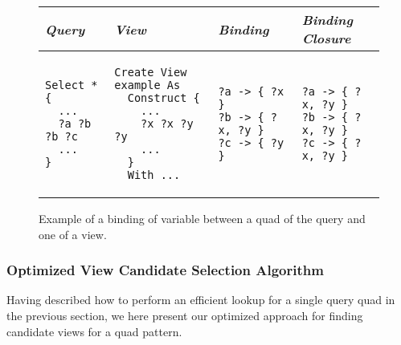 \documentclass[a4paper,twoside,bibtotoc,abstracton,12pt,BCOR=15mm]{scrreprt}
\begin{document}
\begin{figure}[!h]
\centering
\begin{tabular}{llll}
\toprule
\emph{Query} & \emph{View} & \emph{Binding} & \emph{Binding Closure} \\ 
\midrule

\begin{minipage}{3cm}
\begin{scriptsize}
\begin{verbatim}
Select * {
  ...
  ?a ?b ?b ?c
  ...
}
\end{verbatim}
\end{scriptsize}
\end{minipage}

&

\begin{minipage}{3cm}
\begin{scriptsize}
\begin{verbatim}
Create View example As
  Construct {
    ...
    ?x ?x ?y ?y
    ...
  }
  With ...
\end{verbatim}
\end{scriptsize}
\end{minipage}

&

\begin{minipage}{3cm}
\begin{scriptsize}
\begin{verbatim}
?a -> { ?x }
?b -> { ?x, ?y }
?c -> { ?y }
\end{verbatim}
\end{scriptsize}
\end{minipage}

&

\begin{minipage}{3cm}
\begin{scriptsize}
\begin{verbatim}
?a -> { ?x, ?y }
?b -> { ?x, ?y }
?c -> { ?x, ?y }
\end{verbatim}
\end{scriptsize}
\end{minipage}

\\

\bottomrule
\end{tabular}
\caption{Example of a binding of variable between a quad of the query and one of a view.}
\label{fig:binding-multimap}
\end{figure}


\subsubsection{Optimized View Candidate Selection Algorithm}
Having described how to perform an efficient lookup for a single query quad in the previous section, we here present our optimized approach
for finding candidate views for a quad pattern. 
\end{document}
